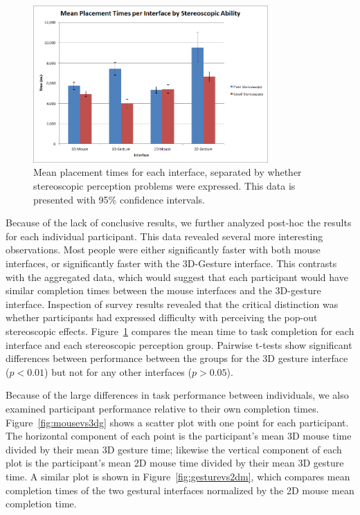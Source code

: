 \documentclass[pageno]{jpaper}
\begin{document}
\begin{figure}
\centering
\includegraphics[width=0.8\textwidth]{figures/mean.png}
\caption{Mean placement times for each interface, separated by whether
stereoscopic perception problems were expressed. This data is presented with 95\% confidence intervals.}
\label{fig:sepmean}
\end{figure}
Because of the lack of conclusive results, we further analyzed post-hoc the results for each individual participant. This data revealed several more interesting observations.
Most people were either significantly faster with both mouse interfaces, or significantly faster with the 3D-Gesture interface.
This contrasts with the aggregated data, which would suggest that each participant would have similar completion times between the mouse interfaces and the 3D-gesture
interface. Inspection of survey results revealed that the critical distinction
was whether participants had expressed difficulty with perceiving
the pop-out stereoscopic effects. Figure~\ref{fig:sepmean} compares the mean
time to task completion for each interface and each stereoscopic perception
group. Pairwise t-tests show significant differences between performance between
the groups for the 3D gesture interface ($p < 0.01$) but not for any other
interfaces ($p > 0.05$). 

Because of the large differences in task performance between individuals, we
also examined participant performance relative to their own completion times.
Figure~\ref{fig:mousevs3dg} shows a scatter plot with one point for each
participant. The horizontal component of each point is the participant's mean 3D
mouse time divided by their mean 3D gesture time; likewise the vertical
component of each plot is the participant's mean 2D mouse time divided by their
mean 3D gesture time. A similar plot is shown in Figure~\ref{fig:gesturevs2dm},
which compares mean completion times of the two gestural interfaces normalized
by the 2D mouse mean completion time.
\end{document}
